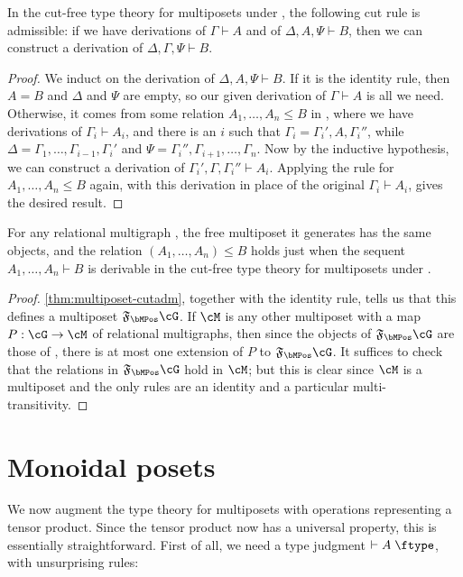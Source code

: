 \documentclass{book}
\let\types\vdash
\def\type{\;\ftype}
\newcommand{\F}[1]{\mathfrak{F}_{#1}}
\def\one{\mathbf{1}}
\let\tensor\otimes
\begin{document}
\begin{thm}\label{thm:multiposet-cutadm}
  In the cut-free type theory for multiposets under \cG, the following cut rule is admissible: if we have derivations of $\Gamma\types A$ and of $\Delta,A,\Psi\types B$, then we can construct a derivation of $\Delta,\Gamma,\Psi\types B$.
\end{thm}
\begin{proof}
  We induct on the derivation of $\Delta,A,\Psi\types B$.
  If it is the identity rule, then $A=B$ and $\Delta$ and $\Psi$ are empty, so our given derivation of $\Gamma\types A$ is all we need.
  Otherwise, it comes from some relation $A_1,\dots,A_n \le B$ in \cG, where we have derivations of $\Gamma_i \types A_i$, and there is an $i$ such that $\Gamma_i = \Gamma_i',A,\Gamma_i''$, while $\Delta = \Gamma_1,\dots,\Gamma_{i-1},\Gamma_i'$ and $\Psi = \Gamma_i'',\Gamma_{i+1},\dots,\Gamma_n$.
  Now by the inductive hypothesis, we can construct a derivation of $\Gamma_i',\Gamma,\Gamma_i''\types A_i$.
  Applying the rule for $A_1,\dots,A_n \le B$ again, with this derivation in place of the original $\Gamma_i \types A_i$, gives the desired result.
\end{proof}

\begin{thm}\label{thm:multiposet-initial}
  For any relational multigraph \cG, the free multiposet it generates has the same objects, and the relation $(A_1,\dots,A_n)\le B$ holds just when the sequent $A_1,\dots,A_n\types B$ is derivable in the cut-free type theory for multiposets under \cG.
\end{thm}
\begin{proof}
  \cref{thm:multiposet-cutadm}, together with the identity rule, tells us that this defines a multiposet $\F\bMPos\cG$.
  If $\cM$ is any other multiposet with a map $P:\cG\to\cM$ of relational multigraphs, then since the objects of $\F\bMPos\cG$ are those of \cG, there is at most one extension of $P$ to $\F\bMPos\cG$.
  It suffices to check that the relations in $\F\bMPos\cG$ hold in $\cM$; but this is clear since $\cM$ is a multiposet and the only rules are an identity and a particular multi-transitivity.
\end{proof}

\section{Monoidal posets}
\label{sec:monpos}

We now augment the type theory for multiposets with operations representing a tensor product.
Since the tensor product now has a universal property, this is essentially straightforward.
First of all, we need a type judgment $\types A\type$, with unsurprising rules:
\end{document}

